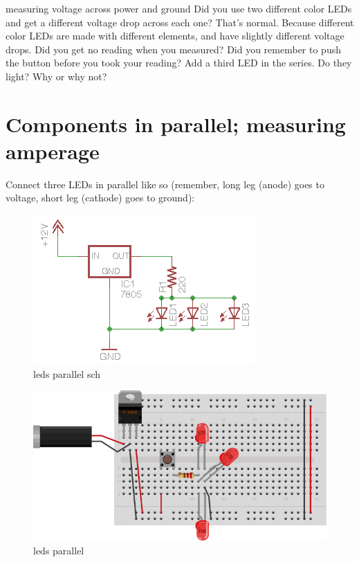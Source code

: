 measuring voltage across power and ground
Did you use two different color LEDs and get a different voltage drop across each one? That's normal. Because different color LEDs are made with different elements, and have slightly different voltage drops.
Did you get no reading when you measured? Did you remember to push the button before you took your reading?
Add a third LED in the series. Do they light? Why or why not?

\section{Components in parallel; measuring amperage}

Connect three LEDs in parallel like so (remember, long leg (anode) goes to voltage, short leg (cathode) goes to ground):

\begin{figure}[!htb]
 \centering
 \includegraphics[scale=0.8]{img/electronics/leds_parallel_sch.png}
 \caption{leds parallel sch}
 \label{leds parallel sch}
\end{figure}

\begin{figure}[!htb]
 \centering
 \includegraphics[scale=0.8]{img/electronics/leds_parallel.png}
 \caption{leds parallel}
 \label{leds parallel}
\end{figure}

